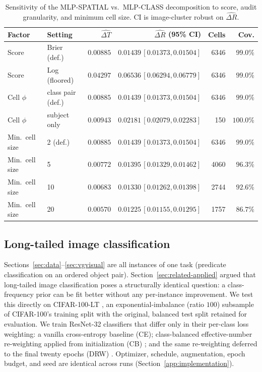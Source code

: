 \begin{table}[t]
\centering
\caption{Sensitivity of the MLP-SPATIAL vs.\ MLP-CLASS decomposition to score, audit
granularity, and minimum cell size. CI is image-cluster robust on $\widehat{\Delta R}$.}
\label{tab:sensitivity}
\small
\begin{tabular}{@{}llrr@{\,}rr@{}}
\toprule
Factor & Setting & $\widehat{\Delta T}$ & \multicolumn{1}{r}{$\widehat{\Delta R}$ (95\% CI)} & Cells &
Cov. \\
\midrule
Score & Brier (def.) & $0.00885$ & $0.01439\,[0.01373,0.01504]$ & 6346 & $99.0\%$ \\
Score & Log (floored) & $0.04297$ & $0.06536\,[0.06294,0.06779]$ & 6346 & $99.0\%$ \\
Cell $\phi$ & class pair (def.) & $0.00885$ & $0.01439\,[0.01373,0.01504]$ & 6346 & $99.0\%$ \\
Cell $\phi$ & subject only & $0.00943$ & $0.02181\,[0.02079,0.02283]$ & 150 & $100.0\%$ \\
Min.\ cell size & 2 (def.) & $0.00885$ & $0.01439\,[0.01373,0.01504]$ & 6346 & $99.0\%$ \\
Min.\ cell size & 5 & $0.00772$ & $0.01395\,[0.01329,0.01462]$ & 4060 & $96.3\%$ \\
Min.\ cell size & 10 & $0.00683$ & $0.01330\,[0.01262,0.01398]$ & 2744 & $92.6\%$ \\
Min.\ cell size & 20 & $0.00570$ & $0.01225\,[0.01155,0.01295]$ & 1757 & $86.7\%$ \\
\bottomrule
\end{tabular}
\end{table}


\subsection{Long-tailed image classification}\label{app:lt}\label{sec:cifarlt}

Sections~\ref{sec:data}--\ref{sec:vgvisual} are all instances of one task (predicate
classification on an ordered object pair). Section~\ref{sec:related-applied} argued
that long-tailed image classification poses a structurally identical question: a
class-frequency prior can be fit better without any per-instance improvement. We test
this directly on CIFAR-100-LT \citep{cui2019classbalanced}, an exponential-imbalance
(ratio $100$) subsample of CIFAR-100's training split with the original, balanced test
split retained for evaluation. We train ResNet-32 \citep{he2016deep} classifiers that
differ only in their per-class loss weighting: a vanilla cross-entropy baseline (CE);
class-balanced effective-number re-weighting applied from initialization (CB)
\citep{cui2019classbalanced}; and the same re-weighting deferred to the final twenty
epochs (DRW) \citep{cao2019learning}. Optimizer, schedule, augmentation, epoch budget,
and seed are identical across runs (Section~\ref{app:implementation}).

